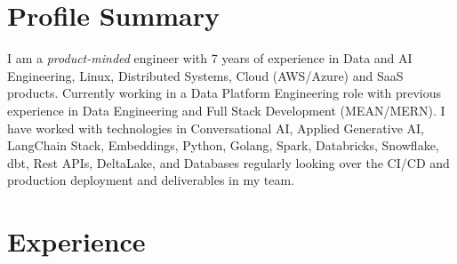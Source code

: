 \documentclass[]{deedy-resume-reversed}
\begin{document}
%
%
\lastupdated

%
%


\section{Profile Summary}
\justifying
I am a \textit{product-minded} engineer with 7 years of experience in Data and AI Engineering, Linux, Distributed Systems, Cloud (AWS/Azure) and SaaS products. Currently working in a Data Platform Engineering role with previous experience in Data Engineering and Full Stack Development (MEAN/MERN). I have worked with technologies in Conversational AI, Applied Generative AI, LangChain Stack, Embeddings, Python, Golang, Spark, Databricks, Snowflake, dbt, Rest APIs, DeltaLake, and Databases regularly looking over the CI/CD and production deployment and deliverables in my team.


\section{Experience}
\end{document}
